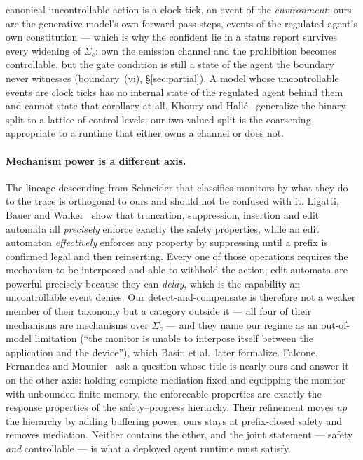 \documentclass[11pt,a4paper]{article}  \usepackage{mdframed} \usepackage{graphicx}
\begin{document}
canonical uncontrollable action is a clock tick, an event of the \emph{environment}; ours are the generative model's own
forward-pass steps, events of the regulated agent's own constitution --- which is why the confident lie in a status report
survives every widening of $\Sigma_c$: own the emission channel and the prohibition becomes controllable, but the gate
condition is still a state of the agent the boundary never witnesses (boundary~(vi), \S\ref{sec:partial}). A model whose
uncontrollable events are clock ticks has no internal state of the regulated agent behind them and cannot state that
corollary at all. Khoury and Hall\'e~\cite{kh15}
generalize the binary split to a lattice of control levels; our two-valued split is the coarsening appropriate to a runtime
that either owns a channel or does not.

\paragraph{Mechanism power is a different axis.} The lineage descending from Schneider that classifies monitors by what they
do to the trace is orthogonal to ours and should not be confused with it. Ligatti, Bauer and Walker~\cite{lbw05} show that
truncation, suppression, insertion and edit automata all \emph{precisely} enforce exactly the safety properties, while an
edit automaton \emph{effectively} enforces any property by suppressing until a prefix is confirmed legal and then
reinserting. Every one of those operations requires the mechanism to be interposed and able to withhold the action; edit
automata are powerful precisely because they can \emph{delay}, which is the capability an uncontrollable event denies. Our
detect-and-compensate is therefore not a weaker member of their taxonomy but a category outside it --- all four of their
mechanisms are mechanisms over $\Sigma_c$ --- and they name our regime as an out-of-model limitation (``the monitor is
unable to interpose itself between the application and the device''), which Basin et al.\ later formalize. Falcone, Fernandez
and Mounier~\cite{ffm12} ask a question whose title is nearly ours and answer it on the other axis: holding complete
mediation fixed and equipping the monitor with unbounded finite memory, the enforceable properties are exactly the response
properties of the safety--progress hierarchy. Their refinement moves \emph{up} the hierarchy by adding buffering power; ours
stays at prefix-closed safety and removes mediation. Neither contains the other, and the joint statement --- safety
\emph{and} controllable --- is what a deployed agent runtime must satisfy.
\end{document}
